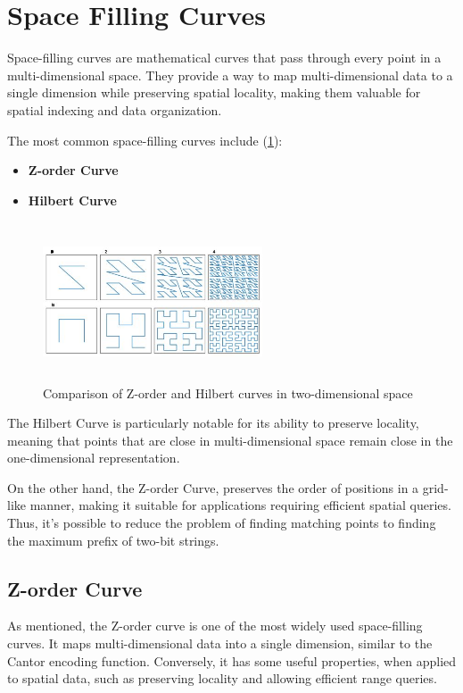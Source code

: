 \vspace{5mm}

\section{Space Filling Curves}
Space-filling curves are mathematical curves that pass through every point in a multi-dimensional space. They provide a way to map multi-dimensional data to a single dimension while preserving spatial locality, making them valuable for spatial indexing and data organization.

The most common space-filling curves include (\cref{fig:space-filling}):
\begin{itemize}
    \item \textbf{Z-order Curve}
    \item \textbf{Hilbert Curve}
\end{itemize}


\begin{figure}[h]
    \centering
    \includegraphics[width=6.5cm,height=4.7cm]{img/hilbert-z-order.jpg}
    \caption{Comparison of Z-order and Hilbert curves in two-dimensional space}
    \label{fig:space-filling}
\end{figure}

\vspace{5mm}

The Hilbert Curve is particularly notable for its ability to preserve locality, meaning that points that are close in multi-dimensional space remain close in the one-dimensional representation.

On the other hand, the Z-order Curve, preserves the order of positions in a grid-like manner, making it suitable for applications requiring efficient spatial queries. Thus, it's possible to reduce the problem of finding matching points to finding the maximum prefix of two-bit strings.

\subsection{Z-order Curve} \label{sec:z-order-curve}
As mentioned, the Z-order curve is one of the most widely used space-filling curves. It maps multi-dimensional data into a single dimension, similar to the Cantor encoding function. Conversely, it has some useful properties, when applied to spatial data, such as preserving locality and allowing efficient range queries.

